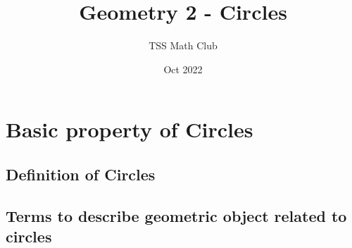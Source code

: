 \documentclass{article}
\title{Geometry 2 - Circles}
\author{TSS Math Club}
\date{Oct 2022}
\begin{document}
\large

\maketitle

\section{Basic property of Circles}
\subsection{Definition of Circles}
\subsection{Terms to describe geometric object related to circles}
\end{document}
